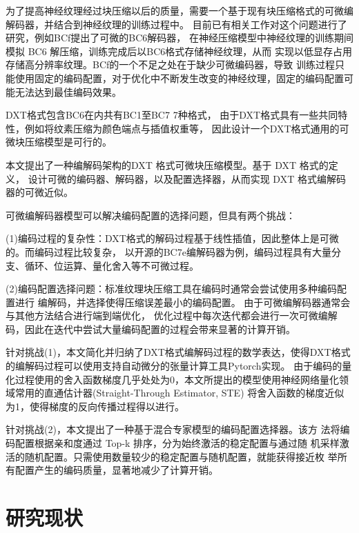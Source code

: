 为了提高神经纹理经过块压缩以后的质量，需要一个基于现有块压缩格式的可微编解码器，并结合到神经纹理的训练过程中。
目前已有相关工作对这个问题进行了研究，例如BCf\cite{weinreich2024real}提出了可微的BC6解码器，
在神经压缩模型中神经纹理的训练期间模拟 BC6 解压缩，训练完成后以BC6格式存储神经纹理，从而
实现以低显存占用存储高分辨率纹理。BCf\cite{weinreich2024real}的一个不足之处在于缺少可微编码器，导致
训练过程只能使用固定的编码配置，对于优化中不断发生改变的神经纹理，固定的编码配置可能无法达到最佳编码效果。

DXT格式包含BC6在内共有BC1至BC7 7种格式，
由于DXT格式具有一些共同特性，例如将纹素压缩为颜色端点与插值权重等，
因此设计一个DXT格式通用的可微块压缩模型是可行的。

本文提出了一种编解码架构的DXT 格式可微块压缩模型。基于 DXT 格式的定义，
设计可微的编码器、解码器，以及配置选择器，从而实现 DXT 格式编解码器的可微近似。

可微编解码器模型可以解决编码配置的选择问题，但具有两个挑战：

(1)编码过程的复杂性：DXT格式的解码过程基于线性插值，因此整体上是可微的。而编码过程比较复杂，
以开源的BC7e编解码器为例，编码过程具有大量分支、循环、位运算、量化舍入等不可微过程。

(2)编码配置选择问题：标准纹理块压缩工具在编码时通常会尝试使用多种编码配置进行
编解码，并选择使得压缩误差最小的编码配置。
由于可微编解码器通常会与其他方法结合进行端到端优化，
优化过程中每次迭代都会进行一次可微编解码，因此在迭代中尝试大量编码配置的过程会带来显著的计算开销。

针对挑战(1)，本文简化并归纳了DXT格式编解码过程的数学表达，使得DXT格式的编解码过程可以使用支持自动微分的张量计算工具Pytorch实现。
由于编码的量化过程使用的舍入函数梯度几乎处处为0，本文所提出的模型使用神经网络量化领域常用的直通估计器\cite{bengio2013estimating}(Straight-Through Estimator, STE)
将舍入函数的梯度近似为1，使得梯度的反向传播过程得以进行。

针对挑战(2)，本文提出了一种基于混合专家模型的编码配置选择器。该方
法将编码配置根据亲和度通过 Top-k 排序，分为始终激活的稳定配置与通过随
机采样激活的随机配置。只需使用数量较少的稳定配置与随机配置，就能获得接近枚
举所有配置产生的编码质量，显著地减少了计算开销。

\section{研究现状}

